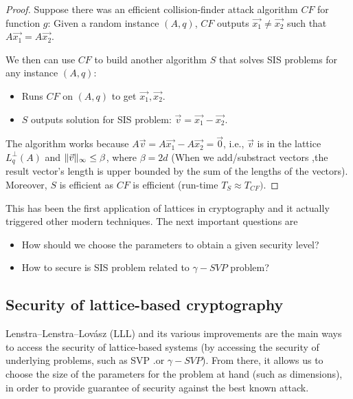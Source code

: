 \begin{proof}
  Suppose there was an efficient collision-finder attack algorithm $CF$ for
  function $g$: Given a random instance $(A,q)$, $CF$ outputs
  $\vec{x_1} \neq \vec{x_2}$ such that $A\vec{x_1} = A\vec{x_2}$.

  We then can use $CF$ to build another algorithm $S$ that solves SIS problems
  for any instance $(A,q)$:
  \begin{itemize}
  \item Runs $CF$ on $(A,q)$ to get $\vec{x_1},\vec{x_2}$.
  \item $S$ outputs solution for SIS problem: $\vec{v} = \vec{x_1} - \vec{x_2}$.
  \end{itemize}

  The algorithm works because $A\vec{v} = A\vec{x_1} - A\vec{x_2} = \vec{0}$,
  i.e., $\vec{v}$ is in the lattice $L_q^\bot(A)$ and
  $\Vert \vec{v} \Vert_{\infty} \leq \beta$, where $\beta = 2d$ (When we add/substract
  vectors ,the result vector's length is upper bounded by the sum of the lengths
  of the vectors). Moreover, $S$ is efficient as $CF$ is efficient (run-time
  $T_S \approx T_{CF})$.
\end{proof}
This has been the first application of lattices in cryptography and it actually
triggered other modern techniques. The next important questions are
\begin{itemize}
\item How should we choose the parameters to obtain a given security level?
\item How to secure is SIS problem related to $\gamma-SVP$ problem?
\end{itemize}

\subsection{Security of lattice-based cryptography}
\label{sec:latticeSecurity}
Lenstra–Lenstra–Lovász (LLL) and its various improvements are the main ways to
access the security of lattice-based systems (by accessing the security of
underlying problems, such as SVP .or $\gamma-SVP$). From there, it allows us to
choose the size of the parameters for the problem at hand (such as dimensions), in order
to provide guarantee of security against the best known attack.

